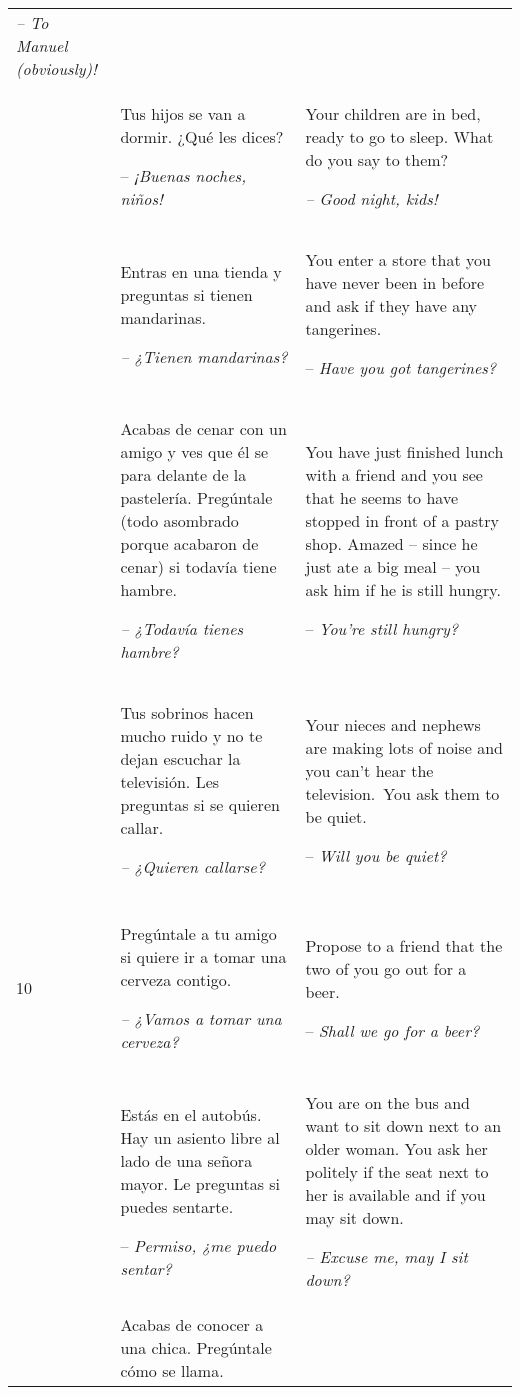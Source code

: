 \begin{xltabular}{\textwidth}{lQQ}
{\itshape -- To Manuel (obviously)!}\\
 & Tus hijos se van a dormir. ¿Qué les dices?

-- \textit{¡Buenas noches, niños!} & Your children are in bed, ready to go to sleep. What do you say to them?

\textit{-- Good night, kids!}\\
 & Entras en una tienda y preguntas si tienen mandarinas.

\textit{-- ¿Tienen mandarinas?} & You enter a store that you have never been in before and ask if they have any tangerines.

-- \textit{Have you got tangerines?}\\
 & Acabas de cenar con un amigo y ves que él se para delante de la pastelería. Pregúntale (todo asombrado porque acabaron de cenar) si todavía tiene hambre.

\textit{-- ¿Todavía tienes hambre?} & You have just finished lunch with a friend and you see that he seems to have stopped in front of a pastry shop. Amazed -- since he just ate a big meal -- you ask him if he is still hungry.

-- \textit{You’re still hungry?}\\
 & Tus sobrinos hacen mucho ruido y no te dejan escuchar la televisión. Les preguntas si se quieren callar.

\textit{-- ¿Quieren callarse?} & Your nieces and nephews are making lots of noise and you can’t hear the television.~You ask them to be quiet.

-- \textit{Will you be quiet?}\\
\\
10 & Pregúntale a tu amigo si quiere ir a tomar una cerveza contigo.

\textit{-- ¿Vamos a tomar una cerveza?} & Propose to a friend that the two of you go out for a beer.

-- \textit{Shall we go for a beer?}\\
 & Estás en el autobús. Hay un asiento libre al lado de una señora mayor. Le preguntas si puedes sentarte.

-- \textit{Permiso, ¿me puedo sentar?} & You are on the bus and want to sit down next to an older woman. You ask her politely if the seat next to her is available and if you may sit down.

{\itshape -- Excuse me, may I sit down?}\\
 & Acabas de conocer a una chica. Pregúntale cómo se llama.


\end{xltabular}
